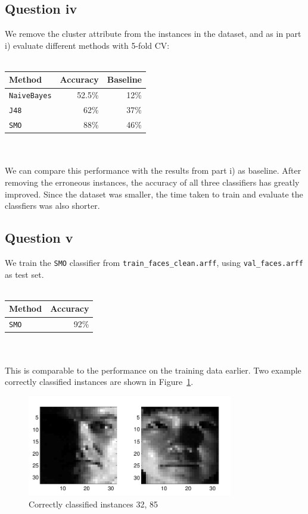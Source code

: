 \documentclass[a4paper]{article}
\begin{document}
\subsection*{Question iv}
We remove the cluster attribute from the instances in the dataset, and as in part i) evaluate different methods with 5-fold CV:\\
\\
\begin{tabular}{lrr}
Method & Accuracy & Baseline \\
\hline
{\tt NaiveBayes} & 52.5\% & 12\% \\
{\tt J48} & 62\% & 37\% \\
{\tt SMO} & 88\% & 46\%
\end{tabular}\\
\\
We can compare this performance with the results from part i) as baseline. After removing the erroneous instances, the accuracy of all three classifiers has greatly improved. Since the dataset was smaller, the time taken to train and evaluate the classfiers was also shorter.

\subsection*{Question v}
We train the {\tt SMO} classifier from {\tt train\_faces\_clean.arff}, using {\tt val\_faces.arff} as test set.\\
\\
\begin{tabular}{lr}
Method & Accuracy \\
\hline
{\tt SMO} & 92\%
\end{tabular}\\
\\
This is comparable to the performance on the training data earlier. Two example correctly classified instances are shown in Figure~\ref{fig:a5img1}.

\begin{figure}[!htbp]
\centering
\includegraphics[width=0.8\textwidth]{A5-correct-cropped.pdf}
\caption{Correctly classified instances 32, 85}
\label{fig:a5img1}
\end{figure}
\end{document}
